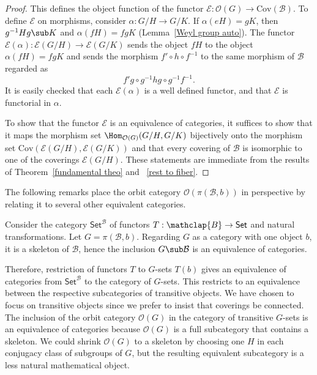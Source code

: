 \begin{proof}
This defines the object function of the functor $\mathscr{E}:\mathcal{O}(G)\to\mathrm{Cov}(\mathcal{B})$. To define $\mathcal{E}$ on morphisms, consider $\alpha:G/H\to G/K$. If $\alpha(eH)=gK$, then $g^{-1}Hg\sub K$ and $\alpha(fH)=fgK$ (Lemma~\ref{Weyl group auto}). The functor $\mathscr{E}(\alpha):\mathscr{E}(G/H)\to\mathscr{E}(G/K)$ sends the object
$fH$ to the object $\alpha(fH)=fgK$ and sends the morphism $f'\circ h\circ f^{-1}$ to the same morphism of $\mathcal{B}$ regarded as 
\[f'g\circ g^{-1}hg\circ g^{-1}f^{-1}.\]
It is easily checked that each $\mathscr{E}(\alpha)$ is a well defined functor, and that $\mathscr{E}$ is functorial in $\alpha$.\par
To show that the functor $\mathscr{E}$ is an equivalence of categories, it suffices to show that it maps the morphism set $\Hom_{\mathcal{O}(G)}(G/H,G/K)$ bijectively onto the morphism set $\mathrm{Cov}(\mathscr{E}(G/H),\mathscr{E}(G/K))$ and that every covering of $\mathcal{B}$ is isomorphic to one of the coverings $\mathscr{E}(G/H)$. These statements are immediate from the results of Theorem~\ref{fundamental theo} and ~\ref{rest to fiber}.
\end{proof}
The following remarks place the orbit category $\mathcal{O}(\pi(\mathcal{B},b))$ in perspective by relating it to several other equivalent categories.
\begin{remark}
Consider the category $\mathsf{Set}^{\mathcal{B}}$ of functors $T:\mathclap{B}\to\mathsf{Set}$ and natural transformations. Let $G=\pi(\mathcal{B},b)$. Regarding $G$ as a category with one object $b$, it is a skeleton of $\mathcal{B}$, hence the inclusion $G\sub\mathcal{B}$ is an equivalence of categories.\par
Therefore, restriction of functors $T$ to $G$-sets $T(b)$ gives an equivalence of categories from $\mathsf{Set}^{\mathcal{B}}$ to the category of $G$-sets. This restricts to an equivalence between the respective subcategories of transitive objects. We have chosen to focus on transitive objects since we prefer to insist that coverings be connected. The inclusion of the orbit category $\mathcal{O}(G)$ in the category of transitive $G$-sets is an equivalence of categories because $\mathcal{O}(G)$ is a full subcategory that contains a skeleton. We could shrink $\mathcal{O}(G)$ to a skeleton by choosing one $H$ in each conjugacy class of subgroups of $G$, but the resulting equivalent subcategory is a less natural mathematical object.
\end{remark}
